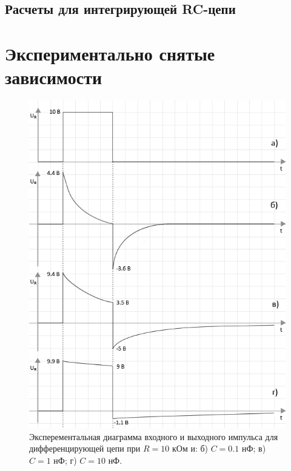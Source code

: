 \subsection{Расчеты для интегрирующей RC-цепи}

\section{Экспериментально снятые зависимости}

\begin{figure}[H]
	\begin{center}
		\includegraphics[width=14cm]{img/diff}
		\caption{Эксперементальная диаграмма входного и выходного импульса для дифференцирующей цепи при $R = 10$ кОм и: б) $C = 0.1$ нФ; в) $C = 1$ нФ; г) $C = 10$ нФ.} 
		\label{t:1} %
	\end{center}
\end{figure}

